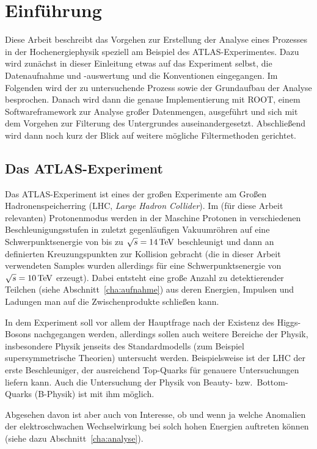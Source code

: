 \section{Einführung}
Diese Arbeit beschreibt das Vorgehen zur Erstellung der Analyse eines Prozesses
in der Hochenergiephysik speziell am Beispiel des ATLAS-Experimentes. Dazu wird
zunächst in dieser Einleitung etwas auf das Experiment selbst, die Datenaufnahme
und -auswertung und die Konventionen eingegangen. Im Folgenden wird der zu
untersuchende Prozess sowie der Grundaufbau der Analyse besprochen.  Danach wird
dann die genaue Implementierung mit ROOT, einem Softwareframework zur Analyse
großer Datenmengen, ausgeführt und sich mit dem Vorgehen zur Filterung des
Untergrundes auseinandergesetzt. Abschließend wird dann noch kurz der Blick auf
weitere mögliche Filtermethoden gerichtet.

\subsection{Das ATLAS-Experiment}
Das ATLAS-Experiment ist eines der großen Experimente am Großen
Hadronenspeicherring (LHC, \emph{Large Hadron Collider}). Im (für diese Arbeit
relevanten) Protonenmodus werden in der Maschine Protonen in verschiedenen
Beschleunigungsstufen in zuletzt gegenläufigen Vakuumröhren auf eine
Schwerpunktsenergie von bis zu $\sqrt{s} = \unit[14]{TeV}$ beschleunigt und dann
an definierten Kreuzungspunkten zur Kollision gebracht (die in dieser Arbeit
verwendeten Samples wurden allerdings für eine Schwerpunktsenergie von $\sqrt s
= \unit[10]{TeV}$ erzeugt). Dabei entsteht eine große Anzahl zu detektierender
Teilchen (siehe Abschnitt~\ref{cha:aufnahme}) aus deren Energien, Impulsen und
Ladungen man auf die Zwischenprodukte schließen kann.

In dem Experiment soll vor allem der Hauptfrage nach der Existenz des
Higgs-Bosons nachgegangen werden, allerdings sollen auch weitere Bereiche der
Physik, insbesondere Physik jenseits des Standardmodells (zum Beispiel
supersymmetrische Theorien) untersucht werden. Beispielsweise ist der LHC der
erste Beschleuniger, der ausreichend Top-Quarks für genauere Untersuchungen
liefern kann. Auch die Untersuchung der Physik von Beauty- bzw.\ Bottom-Quarks
(B-Physik) ist mit ihm möglich.

Abgesehen davon ist aber auch von Interesse, ob und wenn ja welche Anomalien der
elektroschwachen Wechselwirkung bei solch hohen Energien auftreten können (siehe
dazu Abschnitt~\ref{cha:analyse}).

